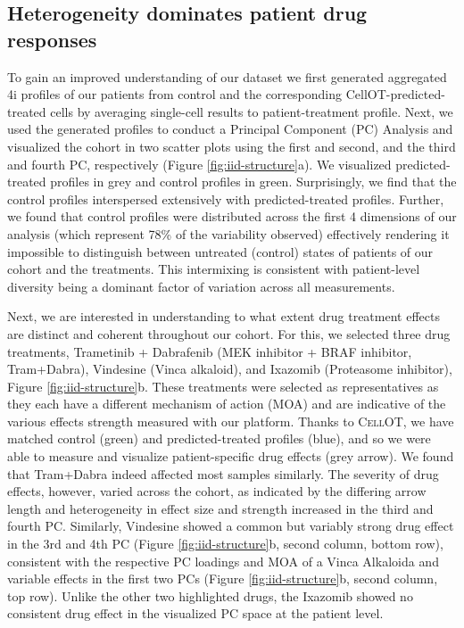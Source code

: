 \subsection{Heterogeneity dominates patient drug responses}
To gain an improved understanding of our dataset we first generated aggregated 4i profiles of our patients from control and the corresponding CellOT-predicted-treated cells by averaging single-cell results to patient-treatment profile.
Next, we used the generated profiles to conduct a Principal Component (PC) Analysis and visualized the cohort in two scatter plots using the first and second, and the third and fourth PC, respectively (Figure \ref{fig:iid-structure}a).
We visualized predicted-treated profiles in grey and control profiles in green.
Surprisingly, we find that the control profiles interspersed extensively with predicted-treated profiles.
Further, we found that control profiles were distributed across the first 4 dimensions of our analysis (which represent 78\% of the variability observed) effectively rendering it impossible to distinguish between untreated (control) states of patients of our cohort and the treatments.
This intermixing is consistent with patient-level diversity being a dominant factor of variation across all measurements.

Next, we are interested in understanding to what extent drug treatment effects are distinct and coherent throughout our cohort.
For this, we selected three drug treatments, Trametinib + Dabrafenib (MEK inhibitor + BRAF inhibitor, Tram+Dabra), Vindesine (Vinca alkaloid), and Ixazomib (Proteasome inhibitor), Figure \ref{fig:iid-structure}b.
These treatments were selected as representatives as they each have a different mechanism of action (MOA) and are indicative of the various effects strength measured with our platform.
Thanks to \textsc{CellOT}, we have matched control (green) and predicted-treated profiles (blue), and so we were able to measure and visualize patient-specific drug effects (grey arrow).
 We found that Tram+Dabra indeed affected most samples similarly.
The severity of drug effects, however, varied across the cohort, as indicated by the differing arrow length and heterogeneity in effect size and strength increased in the third and fourth PC.
 Similarly, Vindesine showed a common but variably strong drug effect in the 3rd and 4th PC (Figure \ref{fig:iid-structure}b, second column, bottom row), consistent with the respective PC loadings and MOA of a Vinca Alkaloida \cite{dhyani2022} and variable effects in the first two PCs (Figure \ref{fig:iid-structure}b, second column, top row).
 Unlike the other two highlighted drugs, the Ixazomib showed no consistent drug effect in the visualized PC space at the patient level.  


